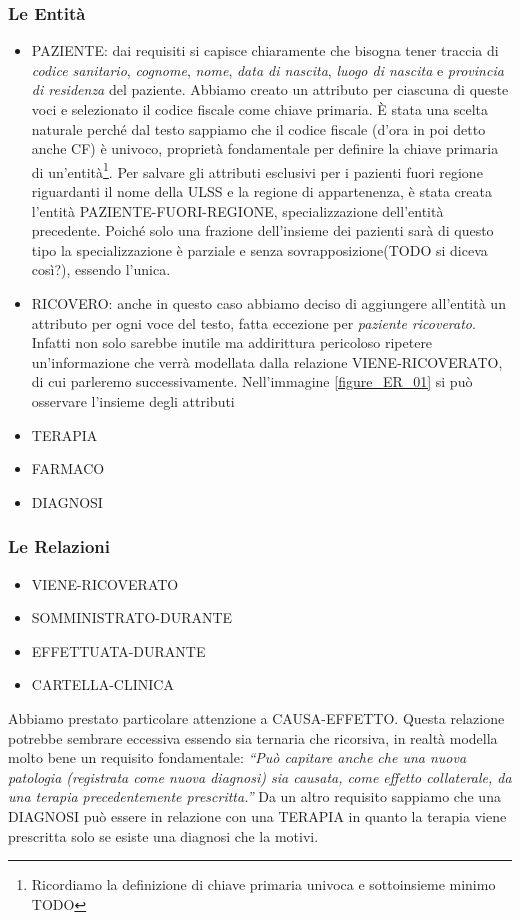 \documentclass{article}
\begin{document}
\subsubsection{Le Entità} %
\begin{itemize}
\item PAZIENTE: dai requisiti si capisce chiaramente che bisogna tener traccia di \textit{codice sanitario}, \textit{cognome}, \textit{nome}, \textit{data di nascita}, \textit{luogo di nascita} e \textit{provincia di residenza} del paziente.
    Abbiamo creato un attributo per ciascuna di queste voci e selezionato il codice fiscale come chiave primaria.
    È stata una scelta naturale perché dal testo sappiamo che il codice fiscale (d'ora in poi detto anche CF) è univoco, proprietà fondamentale per definire la chiave primaria di un'entità\footnote{Ricordiamo la definizione di chiave primaria univoca e sottoinsieme minimo TODO}.
    Per salvare gli attributi esclusivi per i pazienti fuori regione riguardanti il nome della ULSS e la regione di appartenenza, è stata creata l'entità PAZIENTE-FUORI-REGIONE, specializzazione dell'entità precedente.
    Poiché solo una frazione dell'insieme dei pazienti sarà di questo tipo la specializzazione è parziale e senza sovrapposizione(TODO si diceva così?), essendo l'unica.
  \item RICOVERO: anche in questo caso abbiamo deciso di aggiungere all'entità un attributo per ogni voce del testo, fatta eccezione per \textit{paziente ricoverato}.
    Infatti non solo sarebbe inutile ma addirittura pericoloso ripetere un'informazione che verrà modellata dalla relazione VIENE-RICOVERATO, di cui parleremo successivamente.
    Nell'immagine \ref{figure_ER_01} si può osservare l'insieme degli attributi 
  \item TERAPIA
  \item FARMACO
  \item DIAGNOSI
\end{itemize}

\subsubsection{Le Relazioni}
\begin{itemize}
  \item VIENE-RICOVERATO
  \item SOMMINISTRATO-DURANTE
  \item EFFETTUATA-DURANTE
  \item CARTELLA-CLINICA
\end{itemize}
Abbiamo prestato particolare attenzione a CAUSA-EFFETTO.
Questa relazione potrebbe sembrare eccessiva essendo sia ternaria che ricorsiva, in realtà modella molto bene un requisito fondamentale: \textit{``Può capitare anche che una nuova patologia (registrata come nuova diagnosi) sia causata, come effetto collaterale, da una terapia precedentemente prescritta.''}
Da un altro requisito sappiamo che una DIAGNOSI può essere in relazione con una TERAPIA in quanto la terapia viene prescritta solo se esiste una diagnosi che la motivi.
\end{document}
